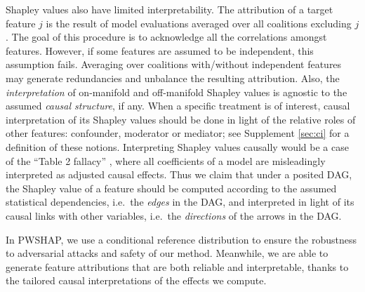 \documentclass{article}
\theoremstyle{plain}
\theoremstyle{definition}
\theoremstyle{remark}
\theoremstyle{mystyle}
\begin{document}
Shapley values also have limited interpretability. 
The attribution of a target feature $j$ is the result of model evaluations averaged over all coalitions excluding $j$. The goal of this procedure is to acknowledge all the correlations amongst features. However, if some features are assumed to be independent, this assumption fails. Averaging over coalitions with/without independent features may generate redundancies and unbalance the resulting attribution. 
Also, the \emph{interpretation} of on-manifold and off-manifold Shapley values is agnostic to the assumed \emph{causal structure}, if any.  When a specific treatment is of interest, causal interpretation of its Shapley values should be done in light of the relative roles of other features: confounder, moderator or mediator; see Supplement \ref{sec:ci} for a definition of these notions. Interpreting Shapley values causally would be a case of 
the ``Table 2 fallacy'' , where all coefficients of a model are misleadingly interpreted as adjusted causal effects. Thus we claim that under a posited DAG, the Shapley value of a feature should be computed according to the assumed statistical dependencies, i.e.\ the \emph{edges} in the DAG, and interpreted in light of its causal links with other variables, i.e.\ the \emph{directions} of the arrows in the DAG. 

In PWSHAP, we use a conditional reference distribution to ensure the robustness to adversarial attacks and safety of our method. Meanwhile, we are able to generate feature attributions that are both reliable and interpretable, thanks to the tailored causal interpretations of the effects we compute.

\end{document}
